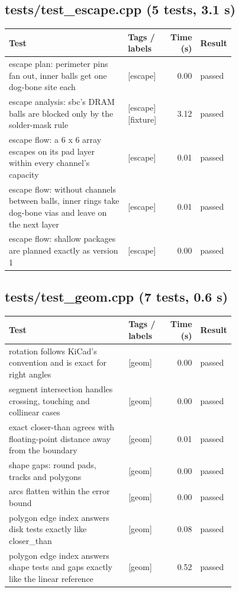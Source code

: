 \subsection*{tests/\allowbreak{}test\_\allowbreak{}escape.cpp (5 tests, 3.1 s)}
\begin{longtable}{@{}p{0.57\linewidth}p{0.19\linewidth}rl@{}}
\toprule Test & Tags / labels & Time (s) & Result \\ \midrule \endhead
escape plan: perimeter pins fan out, inner balls get one dog-bone site each & {\footnotesize [escape]} & 0.00 & passed \\
escape analysis: sbc's DRAM balls are blocked only by the solder-mask rule & {\footnotesize [escape][fixture]} & 3.12 & passed \\
escape flow: a 6 x 6 array escapes on its pad layer within every channel's capacity & {\footnotesize [escape]} & 0.01 & passed \\
escape flow: without channels between balls, inner rings take dog-bone vias and leave on the next layer & {\footnotesize [escape]} & 0.01 & passed \\
escape flow: shallow packages are planned exactly as version 1 & {\footnotesize [escape]} & 0.00 & passed \\
\bottomrule\end{longtable}
\subsection*{tests/\allowbreak{}test\_\allowbreak{}geom.cpp (7 tests, 0.6 s)}
\begin{longtable}{@{}p{0.57\linewidth}p{0.19\linewidth}rl@{}}
\toprule Test & Tags / labels & Time (s) & Result \\ \midrule \endhead
rotation follows KiCad's convention and is exact for right angles & {\footnotesize [geom]} & 0.00 & passed \\
segment intersection handles crossing, touching and collinear cases & {\footnotesize [geom]} & 0.00 & passed \\
exact closer-than agrees with floating-point distance away from the boundary & {\footnotesize [geom]} & 0.01 & passed \\
shape gaps: round pads, tracks and polygons & {\footnotesize [geom]} & 0.00 & passed \\
arcs flatten within the error bound & {\footnotesize [geom]} & 0.00 & passed \\
polygon edge index answers disk tests exactly like closer\_than & {\footnotesize [geom]} & 0.08 & passed \\
polygon edge index answers shape tests and gaps exactly like the linear reference & {\footnotesize [geom]} & 0.52 & passed \\
\bottomrule\end{longtable}
